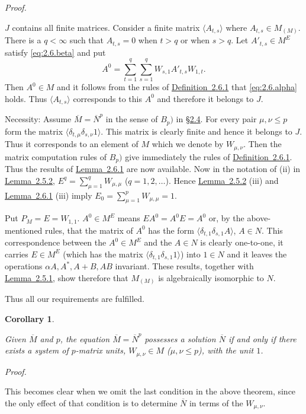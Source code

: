 \documentclass[b5paper,twoside]{article}
\makeatletter
\newcommand{\MvNSetCurrentLabel}[2]{%
  \edef\@currentlabel{#1}%
  \edef\@currentlabelname{#2}%
}
\newcommand{\MvNTargetLabel}[3]{%
  \phantomsection
  \begingroup
    \MvNSetCurrentLabel{#2}{#3}%
    \label{#1}%
  \endgroup
}
\newcommand{\secref}[2]{\hyperref[#1]{\mbox{\S#2}}}
\newcommand{\lemref}[2]{\hyperref[#1]{\mbox{Lemma~#2}}}
\newcommand{\defref}[2]{\hyperref[#1]{\mbox{Definition~#2}}}
\theoremstyle{mvnplain}
\newtheorem*{corollary}{Corollary}
\renewenvironment{proof}[1][Proof]{%
  \par\addvspace{0.35\baselineskip}%
  \noindent\textit{#1.}\ \normalfont\ignorespaces
}{%
  \par\addvspace{0.35\baselineskip}%
}
\newcommand{\M}{\mathbf M}
\newcommand{\N}{\mathbf N}
\def\M{M}%
\def\N{N}%
\def\mathfrak#1{#1}%
\makeatother
\begin{document}
\begin{proof}
$\mathfrak J$ contains all finite matrices.  Consider a finite matrix
$\langle A_{t,s}\rangle$ where $A_{t,s}\in\M_{(\mathfrak M)}$.  There is
a $q<\infty$ such that $A_{t,s}=0$ when $t>q$ or when $s>q$.  Let
$A'_{t,s}\in\M^{E}$ satisfy \eqref{eq:2.6.beta} and put
\[
  A^{0}=\sum_{t=1}^{q}\sum_{s=1}^{q}W_{s,1}A'_{t,s}W_{1,t}.
\]
Then $A^{0}\in\M$ and it follows from the rules of
\defref{def:2.6.1}{2.6.1} that \eqref{eq:2.6.alpha} holds.  Thus
$\langle A_{t,s}\rangle$ corresponds to this $A^{0}$ and therefore it
belongs to $\mathfrak J$.

Necessity: Assume $\overline{\M}=\overline{\N}^{p}$ in the sense of $B_p)$
in \secref{sec:2.4}{2.4}.  For every pair $\mu,\nu\leq p$ form the matrix
$\langle\delta_{t,\mu}\delta_{s,\nu}1\rangle$.  This matrix is clearly
finite and hence it belongs to $\mathfrak J$.  Thus it corresponds to an
element of $\M$ which we denote by $W_{\mu,\nu}$.  Then the matrix
computation rules of $B_p)$ give immediately the rules of
\defref{def:2.6.1}{2.6.1}.  Thus the results of
\lemref{lem:2.6.1}{2.6.1} are now available.  Now in the notation of (ii) in
\lemref{lem:2.5.2}{2.5.2},
$E^q=\sum_{\mu=1}^{q}W_{\mu,\mu}$ ($q=1,2,\ldots$).  Hence
\lemref{lem:2.5.2}{2.5.2} (iii) and \lemref{lem:2.6.1}{2.6.1} (iii) imply
$E_0=\sum_{\mu=1}^{p}W_{\mu,\mu}=1$.

Put $P_{\mathfrak M}=E=W_{1,1}$.  $A^{0}\in\M^{E}$ means
$EA^{0}=A^{0}E=A^{0}$ or, by the above-mentioned rules, that the matrix of
$A^{0}$ has the form
$\langle\delta_{t,1}\delta_{s,1}A\rangle$, $A\in\N$.  This correspondence
between the $A^{0}\in\M^{E}$ and the $A\in\N$ is clearly one-to-one, it
carries $E\in\M^{E}$ (which has the matrix
$\langle\delta_{t,1}\delta_{s,1}1\rangle$) into $1\in\N$ and it leaves the
operations $\alpha A,A^{*},A+B,AB$ invariant.  These results, together with
\lemref{lem:2.5.1}{2.5.1}, show therefore that
$\M_{(\mathfrak M)}$ is algebraically isomorphic to $\N$.

Thus all our requirements are fulfilled.
\end{proof}

\begin{corollary}\MvNTargetLabel{cor:2.6.1}{2.6.1}{Corollary to Lemma 2.6.1}
Given $\overline{\M}$ and $p$, the equation
$\overline{\M}=\overline{\N}^{p}$ possesses a solution $\overline{\N}$ if
and only if there exists a system of $p$-matrix units,
$W_{\mu,\nu}\in\M$ ($\mu,\nu\leq p$), with the unit $1$.
\end{corollary}
\begin{proof}
This becomes clear when we omit the last condition in the above theorem,
since the only effect of that condition is to determine $\overline{\N}$ in
terms of the $W_{\mu,\nu}$.
\end{proof}
\end{document}

